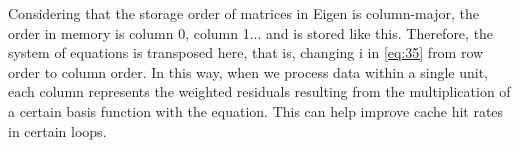 \documentclass{develop-note}
\begin{document}
Considering that the storage order of matrices in Eigen is column-major, the order in memory is column 0, column 1... and is stored like this. Therefore, the system of equations is transposed here, that is, changing i in \autoref{eq:35} from row order to column order. In this way, when we process data within a single unit, each column represents the weighted residuals resulting from the multiplication of a certain basis function with the equation. This can help improve cache hit rates in certain loops.



\end{document}
